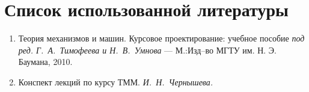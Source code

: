 \section*{Список использованной литературы}
	\begin{enumerate}
		\item  Теория механизмов и машин. Курсовое проектирование: учебное пособие \textit{под ред. Г.~А.~Тимофеева и Н.~В.~Умнова} --- М.:Изд--во МГТУ им. Н. Э. Баумана, 2010.
		\item Конспект лекций по курсу ТММ. {\it И.~Н.~Чернышева.}
	\end{enumerate}
	
